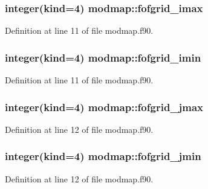 \subsubsection[{\texorpdfstring{fofgrid\+\_\+imax}{fofgrid_imax}}]{\setlength{\rightskip}{0pt plus 5cm}integer(kind=4) modmap\+::fofgrid\+\_\+imax}\hypertarget{namespacemodmap_adf255364fd93d9af29d1f179bf50f5ba}{}\label{namespacemodmap_adf255364fd93d9af29d1f179bf50f5ba}


Definition at line 11 of file modmap.\+f90.

\subsubsection[{\texorpdfstring{fofgrid\+\_\+imin}{fofgrid_imin}}]{\setlength{\rightskip}{0pt plus 5cm}integer(kind=4) modmap\+::fofgrid\+\_\+imin}\hypertarget{namespacemodmap_a4c96661037ebd0e043cf2967b7e94067}{}\label{namespacemodmap_a4c96661037ebd0e043cf2967b7e94067}


Definition at line 11 of file modmap.\+f90.

\subsubsection[{\texorpdfstring{fofgrid\+\_\+jmax}{fofgrid_jmax}}]{\setlength{\rightskip}{0pt plus 5cm}integer(kind=4) modmap\+::fofgrid\+\_\+jmax}\hypertarget{namespacemodmap_a1644332b29d20583060c9316d8cd2fa1}{}\label{namespacemodmap_a1644332b29d20583060c9316d8cd2fa1}


Definition at line 12 of file modmap.\+f90.

\subsubsection[{\texorpdfstring{fofgrid\+\_\+jmin}{fofgrid_jmin}}]{\setlength{\rightskip}{0pt plus 5cm}integer(kind=4) modmap\+::fofgrid\+\_\+jmin}\hypertarget{namespacemodmap_ac44fd964c6a2812634e903df91c5bcb6}{}\label{namespacemodmap_ac44fd964c6a2812634e903df91c5bcb6}


Definition at line 12 of file modmap.\+f90.

